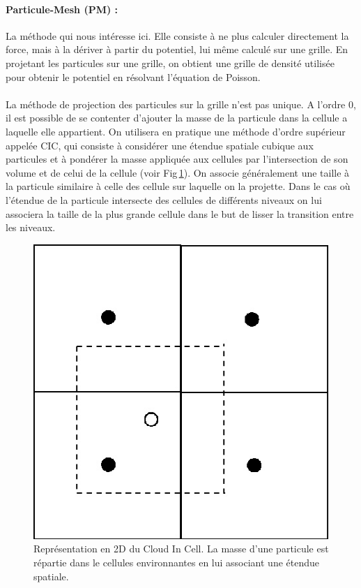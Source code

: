 %


\paragraph{Particule-Mesh (PM) : } La méthode qui nous intéresse ici.
Elle consiste à ne plus calculer directement la force, mais à la dériver à partir du potentiel, lui même calculé sur une grille.
En projetant les particules sur une grille, on obtient une grille de densité utilisée pour obtenir le potentiel en résolvant l'équation de Poisson.

\paragraph{}
La méthode de projection des particules sur la grille n'est pas unique.
A l'ordre $0$, il est possible de se contenter d'ajouter la masse de la particule dans la cellule a laquelle elle appartient.
On utilisera en pratique une méthode d'ordre supérieur appelée \ac{CIC}, qui consiste à considérer une étendue spatiale cubique aux particules et à pondérer la masse appliquée aux cellules par l'intersection de son volume et de celui de la cellule (voir Fig\,\ref{fig:CIC}).
On associe généralement une taille à la particule similaire à celle des cellule sur laquelle on la projette.
Dans le cas où l’étendue de la particule intersecte des cellules de différents niveaux on lui associera la taille de la plus grande cellule dans le but de lisser la transition entre les niveaux.

\begin{figure}
		\centering
        \includegraphics[width=.5\linewidth]{img/02/CIC.jpg} 
        \caption[CIC]{Représentation en 2D du Cloud In Cell. 
        La masse d'une particule est répartie dans le cellules environnantes en lui associant une étendue spatiale.
 		\label{fig:CIC}}
\end{figure}


